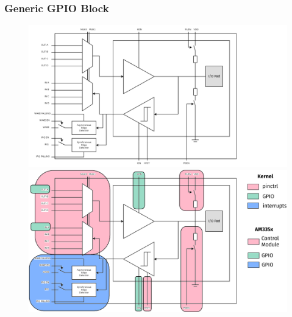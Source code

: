 \documentclass[aspectratio=169,usenames,dvipsnames]{beamer}
\begin{document}
\begin{frame}
  \frametitle{Generic GPIO Block}
  \begin{overlayarea}{\textwidth}{\textheight}
    \begin{figure}
      \centering
      {%
      \includegraphics[scale=0.28]{images/gpio-block.png}%
      }%
      {%
      \includegraphics[scale=0.28]{images/gpio-block-color.png}%
      }%
    \end{figure}
  \end{overlayarea}
  \vspace*{-10mm}
\end{frame}
\end{document}

